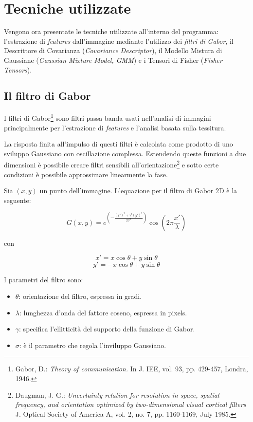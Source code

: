 \section{Tecniche utilizzate}

Vengono ora presentate le tecniche utilizzate all'interno del programma: l'estrazione di \emph{features} dall'immagine mediante l'utilizzo dei \emph{filtri di Gabor}, il Descrittore di Covarianza (\emph{Covariance Descriptor}), il Modello Mistura di Gaussiane (\emph{Gaussian Mixture Model, GMM}) e i Tensori di Fisher (\emph{Fisher Tensors}).

\subsection{Il filtro di Gabor}

I filtri di Gabor\footnote{Gabor, D.: \emph{Theory of communication.} In J. IEE, vol. 93, pp. 429-457, Londra, 1946.} sono filtri passa-banda usati nell'analisi di immagini principalmente per l'estrazione di \emph{features} e l'analisi basata sulla tessitura.

La risposta finita all'impulso di questi filtri è calcolata come prodotto di uno sviluppo Gaussiano con oscillazione complessa. Estendendo queste funzioni a due dimensioni è possibile creare filtri sensibili all'orientazione\footnote{Daugman, J. G.: \emph{Uncertainty relation for resolution in space, spatial frequency, and orientation optimized by two-dimensional visual cortical filters} J. Optical Society of America A, vol. 2, no. 7, pp. 1160-1169, July 1985.} e sotto certe condizioni è possibile approssimare linearmente la fase.

Sia $(x, y)$ un punto dell'immagine. L'equazione per il filtro di Gabor 2D è la seguente:

$$G(x, y) = e^{(- \frac{(x')^2 + \gamma^2 (y')^2}{2 \sigma^2})} \cos (2 \pi \frac{x'}{\lambda})  $$ 

con 

$$x' = x \cos \theta + y \sin \theta$$
$$y' = - x \cos \theta + y \sin \theta$$

I parametri del filtro sono:
\begin{itemize}
\item $\theta$: orientazione del filtro, espressa in gradi.
\item $\lambda$: lunghezza d'onda del fattore coseno, espressa in pixels.
\item $\gamma$: specifica l'ellitticità del supporto della funzione di Gabor.
\item $\sigma$: è il parametro che regola l'inviluppo Gaussiano.
\end{itemize}


